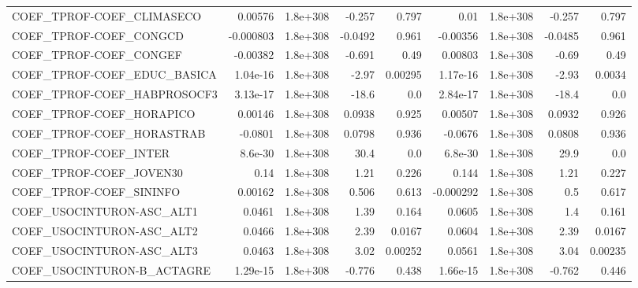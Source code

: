 \begin{tabular}{lrrrrrrrr}
COEF\_TPROF-COEF\_CLIMASECO         &     0.00576 &     1.8e+308 &    -0.257 &    0.797 &       0.01 &    1.8e+308 &       -0.257 &         0.797 \\
COEF\_TPROF-COEF\_CONGCD            &   -0.000803 &     1.8e+308 &   -0.0492 &    0.961 &   -0.00356 &    1.8e+308 &      -0.0485 &         0.961 \\
COEF\_TPROF-COEF\_CONGEF            &    -0.00382 &     1.8e+308 &    -0.691 &     0.49 &    0.00803 &    1.8e+308 &        -0.69 &          0.49 \\
COEF\_TPROF-COEF\_EDUC\_BASICA       &    1.04e-16 &     1.8e+308 &     -2.97 &  0.00295 &   1.17e-16 &    1.8e+308 &        -2.93 &        0.0034 \\
COEF\_TPROF-COEF\_HABPROSOCF3       &    3.13e-17 &     1.8e+308 &     -18.6 &      0.0 &   2.84e-17 &    1.8e+308 &        -18.4 &           0.0 \\
COEF\_TPROF-COEF\_HORAPICO          &     0.00146 &     1.8e+308 &    0.0938 &    0.925 &    0.00507 &    1.8e+308 &       0.0932 &         0.926 \\
COEF\_TPROF-COEF\_HORASTRAB         &     -0.0801 &     1.8e+308 &    0.0798 &    0.936 &    -0.0676 &    1.8e+308 &       0.0808 &         0.936 \\
COEF\_TPROF-COEF\_INTER             &     8.6e-30 &     1.8e+308 &      30.4 &      0.0 &    6.8e-30 &    1.8e+308 &         29.9 &           0.0 \\
COEF\_TPROF-COEF\_JOVEN30           &        0.14 &     1.8e+308 &      1.21 &    0.226 &      0.144 &    1.8e+308 &         1.21 &         0.227 \\
COEF\_TPROF-COEF\_SININFO           &     0.00162 &     1.8e+308 &     0.506 &    0.613 &  -0.000292 &    1.8e+308 &          0.5 &         0.617 \\
COEF\_USOCINTURON-ASC\_ALT1         &      0.0461 &     1.8e+308 &      1.39 &    0.164 &     0.0605 &    1.8e+308 &          1.4 &         0.161 \\
COEF\_USOCINTURON-ASC\_ALT2         &      0.0466 &     1.8e+308 &      2.39 &   0.0167 &     0.0604 &    1.8e+308 &         2.39 &        0.0167 \\
COEF\_USOCINTURON-ASC\_ALT3         &      0.0463 &     1.8e+308 &      3.02 &  0.00252 &     0.0561 &    1.8e+308 &         3.04 &       0.00235 \\
COEF\_USOCINTURON-B\_ACTAGRE        &    1.29e-15 &     1.8e+308 &    -0.776 &    0.438 &   1.66e-15 &    1.8e+308 &       -0.762 &         0.446 \\

\end{tabular}
